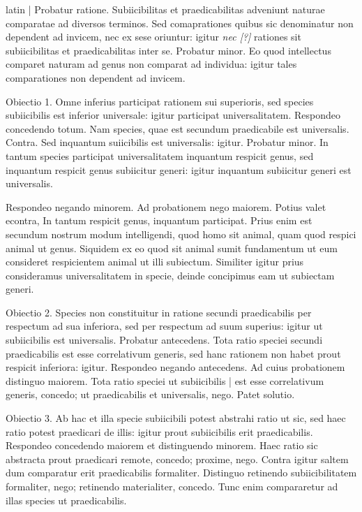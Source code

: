 \begin{otherlanguage*}{latin}
\pstart
 \textnormal{|} Probatur ratione. Subiicibilitas et praedicabilitas adveniunt naturae comparatae ad diversos terminos. Sed comaprationes quibus sic denominatur non dependent  ad invicem, nec ex sese oriuntur: igitur \emph{nec [?]} rationes sit subiicibilitas et praedicabilitas inter se. Probatur minor. Eo quod intellectus comparet naturam ad genus non comparat ad individua: igitur tales comparationes non dependent ad invicem. 
\pend

\pstart
 Obiectio 1. Omne inferius participat rationem sui superioris, sed species subiicibilis est inferior universale: igitur participat universalitatem. Respondeo concedendo totum. Nam species, quae est secundum praedicabile est universalis. Contra. Sed inquantum suiicibilis est universalis: igitur. Probatur minor. In tantum species participat universalitatem inquantum respicit genus, sed inquantum respicit genus subiicitur generi: igitur inquantum subiicitur generi est universalis. 
\pend

\pstart
 Respondeo negando minorem. Ad probationem nego maiorem. Potius valet econtra, In tantum respicit genus, inquantum participat. Prius enim est secundum nostrum modum intelligendi, quod homo sit animal, quam quod respici animal ut genus. Siquidem ex eo quod sit animal sumit fundamentum ut eum consideret respicientem animal ut illi subiectum. Similiter igitur prius consideramus universalitatem in specie, deinde concipimus eam ut subiectam generi. 
\pend

\pstart
 Obiectio 2. Species non constituitur in ratione secundi praedicabilis per respectum ad sua inferiora, sed per respectum ad suum superius: igitur ut subiicibilis est universalis. Probatur antecedens. Tota ratio speciei secundi praedicabilis est esse correlativum generis, sed hanc rationem non habet prout respicit inferiora: igitur. Respondeo negando antecedens. Ad cuius probationem distinguo maiorem. Tota ratio speciei ut subiicibilis \textnormal{|}   est esse correlativum generis, concedo; ut praedicabilis et universalis, nego. Patet solutio. 
\pend

\pstart
 Obiectio 3. Ab hac et illa specie subiicibili potest abstrahi ratio ut sic, sed haec ratio potest praedicari de illis: igitur prout subiicibilis erit praedicabilis. Respondeo concedendo maiorem et distinguendo minorem. Haec ratio sic abstracta prout praedicari remote, concedo; proxime, nego. Contra igitur saltem dum comparatur erit praedicabilis formaliter. Distinguo retinendo subiicibilitatem formaliter, nego; retinendo materialiter, concedo. Tunc enim compararetur ad illas species ut praedicabilis. 
\pend


\end{otherlanguage*}
